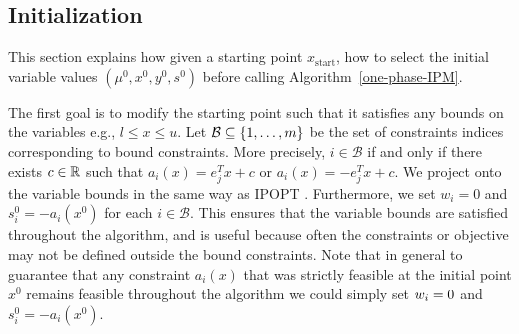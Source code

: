 \documentclass{article}
\begin{document}

\subsection{Initialization}\label{sec:initialization}


This section explains how given a starting point $x_{\text{start}}$, how to select the initial variable values $(\mu^0,x^0, y^0, s^0)$ before calling Algorithm~\ref{one-phase-IPM}.


The first goal is to modify the starting point such that it satisfies any bounds on the variables e.g., $l \le x \le u$. Let $\mathcal{B} \subseteq \{ 1, \dots, m \}$ be the set of constraints indices corresponding to bound constraints. More precisely, $i \in \mathcal{B}$ if and only if there exists $c \in \mathbb{R}$ such that $a_i(x) = e_j^T x + c$ or $a_i(x) = -e_j^T x + c$. We project onto the variable bounds in the same way as IPOPT \cite[Section 3.7]{wachter2006implementation}. Furthermore, we set $w_i = 0$ and $s_i^{0} = -a_i(x^0)$ for each $i \in \mathcal{B}$. This ensures that the variable bounds are satisfied throughout the algorithm, and is useful because often the constraints or objective may not be defined outside the bound constraints. Note that in general to guarantee that any constraint $a_i(x)$ that was strictly feasible at the initial point $x^{0}$ remains feasible throughout the algorithm we could simply set $w_i = 0$ and $s_i^{0} = -a_i(x^0)$.
 



\end{document}

